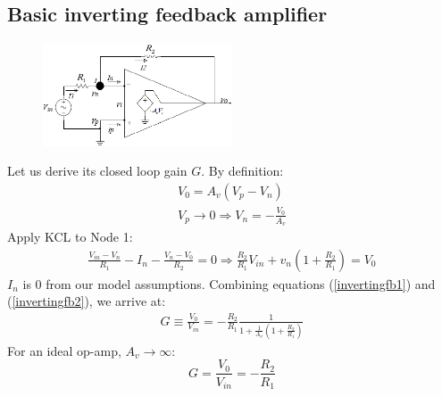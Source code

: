 \documentclass[class=report, crop=false, 12pt,a4paper]{standalone}
\begin{document}
\subsection{Basic inverting feedback amplifier}
\begin{figure}[H]
  \centering
  \includegraphics[width = 0.5\textwidth]{../img/diagram49.png}
\end{figure}
Let us derive its closed loop gain $G$. By definition:
\begin{gather}
  V_0 = A_v(V_p - V_n)\\
  V_p \rightarrow 0 \Longrightarrow V_n = - \frac{V_0}{A_v} \label{invertingfb1}
\end{gather}
Apply KCL to Node 1:
\begin{gather}
  \frac{V_{in}-V_n}{R_1} - I_n - \frac{V_n - V_0}{R_2} = 0 \Longrightarrow \frac{R_2}{R_1}V_{in} + v_n \left( 1 + \frac{R_2}{R_1} \right) = V_0 \label{invertingfb2}
\end{gather}
$I_n$ is 0 from our model assumptions.
Combining equations (\ref{invertingfb1}) and (\ref{invertingfb2}), we arrive at: 
\begin{gather}
  G \equiv \frac{V_0}{V_{in}} = -\frac{R_2}{R_1} \frac{1}{1 + \frac{1}{A_v}\left( 1 + \frac{R_2}{R_1}\right)}
\end{gather}
For an ideal op-amp, $A_v \rightarrow \infty$:
\begin{equation}
  G = \frac{V_0}{V_{in}} = - \frac{R_2}{R_1}
\end{equation}
\end{document}
